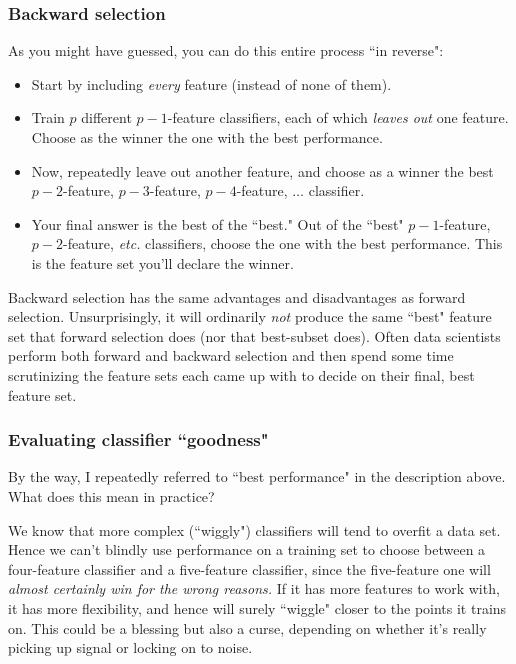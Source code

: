 \documentclass[12pt]{article}
\begin{document}
\subsubsection{Backward selection}

As you might have guessed, you can do this entire process ``in reverse":

\begin{itemize}
\itemsep.1em
\item Start by including \textit{every} feature (instead of none of them).
\item Train $p$ different $p-1$-feature classifiers, each of which
\textit{leaves out} one feature. Choose as the winner the one with the
best performance.
\item Now, repeatedly leave out another feature, and choose as a winner the
best $p-2$-feature, $p-3$-feature, $p-4$-feature, $\dots$ classifier.
\item Your final answer is the best of the ``best." Out of the ``best"
$p-1$-feature, $p-2$-feature, \textit{etc.} classifiers, choose the one with
the best performance. This is the feature set you'll declare the winner.
\end{itemize}

Backward selection has the same advantages and disadvantages as forward
selection. Unsurprisingly, it will ordinarily \textit{not} produce the same
``best" feature set that forward selection does (nor that best-subset does).
Often data scientists perform both forward and backward selection and then
spend some time scrutinizing the feature sets each came up with to decide on
their final, best feature set.

\subsubsection{Evaluating classifier ``goodness"}

By the way, I repeatedly referred to ``best performance" in the description
above. What does this mean in practice? 

We know that more complex (``wiggly") classifiers will tend to overfit a
data set. Hence we can't blindly use performance on a training set to choose
between a four-feature classifier and a five-feature classifier, since the
five-feature one will \textit{almost certainly win for the wrong reasons.} If
it has more features to work with, it has more flexibility, and hence will
surely ``wiggle" closer to the points it trains on. This could be a blessing
but also a curse, depending on whether it's really picking up signal or
locking on to noise.
\end{document}
